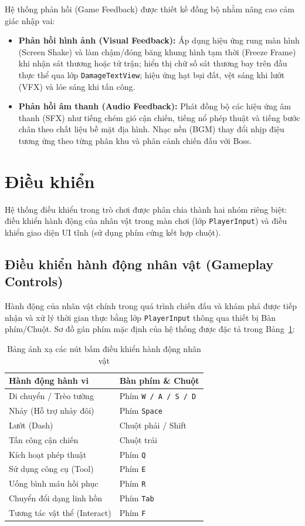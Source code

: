 \documentclass[../DoAn.tex]{subfiles}
\begin{document}
Hệ thống phản hồi (Game Feedback) được thiết kế đồng bộ nhằm nâng cao cảm giác nhập vai:
\begin{itemize}
    \item \textbf{Phản hồi hình ảnh (Visual Feedback):} Áp dụng hiệu ứng rung màn hình (Screen Shake) và làm chậm/đóng băng khung hình tạm thời (Freeze Frame) khi nhận sát thương hoặc tử trận; hiển thị chữ số sát thương bay trên đầu thực thể qua lớp \texttt{DamageTextView}; hiệu ứng hạt bụi đất, vệt sáng khi lướt (VFX) và lóe sáng khi tấn công.
    \item \textbf{Phản hồi âm thanh (Audio Feedback):} Phát đồng bộ các hiệu ứng âm thanh (SFX) như tiếng chém gió cận chiến, tiếng nổ phép thuật và tiếng bước chân theo chất liệu bề mặt địa hình. Nhạc nền (BGM) thay đổi nhịp điệu tương ứng theo từng phân khu và phân cảnh chiến đấu với Boss.
\end{itemize}

\section{Điều khiển}
\label{section:design:3.4}

Hệ thống điều khiển trong trò chơi được phân chia thành hai nhóm riêng biệt: điều khiển hành động của nhân vật trong màn chơi (lớp \texttt{PlayerInput}) và điều khiển giao diện UI tĩnh (sử dụng phím cứng kết hợp chuột).

\subsection{Điều khiển hành động nhân vật (Gameplay Controls)}
\label{subsection:3.4.1}

Hành động của nhân vật chính trong quá trình chiến đấu và khám phá được tiếp nhận và xử lý thời gian thực bằng lớp \texttt{PlayerInput} thông qua thiết bị Bàn phím/Chuột. Sơ đồ gán phím mặc định của hệ thống được đặc tả trong Bảng~\ref{table:control_mappings}:

\begin{table}[H]
\centering
\begin{tabular}{|m{6.5cm}|m{6.5cm}|}
\hline
\textbf{Hành động hành vi} & \textbf{Bàn phím \& Chuột} \\ \hline
Di chuyển / Trèo tường & Phím \texttt{W / A / S / D} \\ \hline
Nhảy (Hỗ trợ nhảy đôi) & Phím \texttt{Space} \\ \hline
Lướt (Dash) & Chuột phải / Shift \\ \hline
Tấn công cận chiến & Chuột trái \\ \hline
Kích hoạt phép thuật & Phím \texttt{Q} \\ \hline
Sử dụng công cụ (Tool) & Phím \texttt{E} \\ \hline
Uống bình máu hồi phục & Phím \texttt{R} \\ \hline
Chuyển đổi dạng linh hồn & Phím \texttt{Tab} \\ \hline
Tương tác vật thể (Interact) & Phím \texttt{F} \\ \hline
\end{tabular}
\caption{Bảng ánh xạ các nút bấm điều khiển hành động nhân vật}
\label{table:control_mappings}
\end{table}
\end{document}
